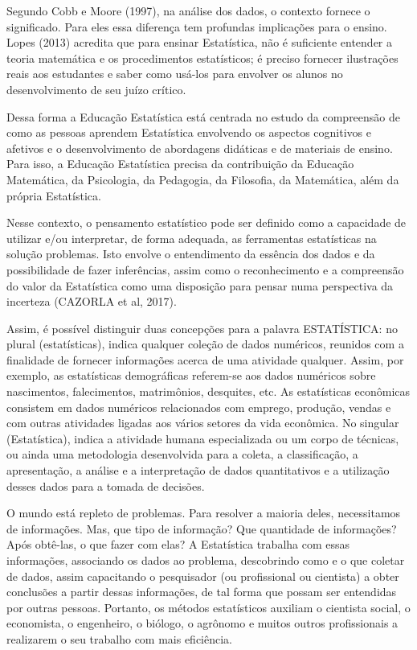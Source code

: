 Segundo Cobb e Moore (1997), na análise dos dados, o contexto fornece o significado. Para eles essa diferença tem profundas implicações para o ensino. Lopes (2013) acredita que para ensinar Estatística, não é suficiente entender a teoria matemática e os procedimentos estatísticos; é preciso fornecer ilustrações reais aos estudantes e saber como usá-los para envolver os alunos no desenvolvimento de seu juízo crítico. \vskip0.3cm

\newpage
Dessa forma a Educação Estatística está centrada no estudo da compreensão de como as pessoas aprendem Estatística envolvendo os aspectos cognitivos e afetivos e o desenvolvimento de abordagens didáticas e de materiais de ensino. Para isso, a Educação Estatística precisa da contribuição da Educação Matemática, da Psicologia, da Pedagogia, da Filosofia, da Matemática, além da própria Estatística. 

Nesse contexto, o pensamento estatístico pode ser definido como a capacidade de utilizar e/ou interpretar, de forma adequada, as ferramentas estatísticas na solução problemas. Isto envolve o entendimento da essência dos dados e da possibilidade de fazer inferências, assim como o reconhecimento e a compreensão do valor da Estatística como uma disposição para pensar numa perspectiva da incerteza (CAZORLA et al, 2017).\vskip0.3cm


Assim, é possível distinguir duas concepções para a palavra ESTATÍSTICA: no plural (estatísticas), indica qualquer coleção de dados numéricos, reunidos com a finalidade de fornecer informações acerca de uma atividade qualquer. Assim, por exemplo, as estatísticas demográficas referem-se aos dados numéricos sobre nascimentos, falecimentos, matrimônios, desquites, etc. As estatísticas econômicas consistem em dados numéricos relacionados com emprego, produção, vendas e com outras atividades ligadas aos vários setores da vida econômica. No singular (Estatística), indica a atividade humana especializada ou um corpo de técnicas, ou ainda uma metodologia desenvolvida para a coleta, a classificação, a apresentação, a análise e a interpretação de dados quantitativos e a utilização desses dados para a tomada de decisões.\vskip0.3cm

O mundo está repleto de problemas. Para resolver a maioria deles, necessitamos de informações. Mas, que tipo de informação? Que quantidade de informações? Após obtê-las, o que fazer com elas? A Estatística trabalha com essas informações, associando os dados ao problema, descobrindo como e o que coletar de dados, assim capacitando o pesquisador (ou profissional ou cientista) a obter conclusões a partir dessas informações, de tal forma que possam ser entendidas por outras pessoas. Portanto, os métodos estatísticos auxiliam o cientista social, o economista, o engenheiro, o biólogo, o agrônomo e muitos outros profissionais a realizarem o seu trabalho com mais eficiência.\vskip0.3cm

